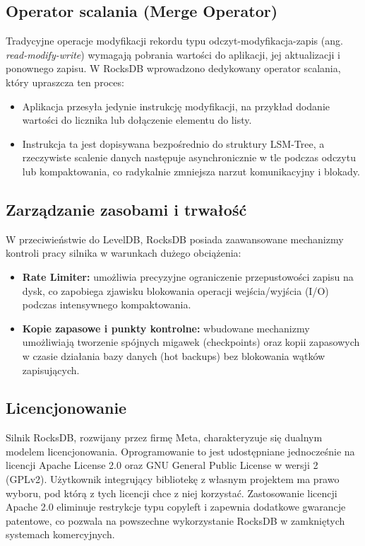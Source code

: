 \subsection{Operator scalania (Merge Operator)}
Tradycyjne operacje modyfikacji rekordu typu odczyt-modyfikacja-zapis (ang. \emph{read-modify-write}) wymagają pobrania wartości do aplikacji, jej aktualizacji i ponownego zapisu. W RocksDB wprowadzono dedykowany operator scalania, który upraszcza ten proces:
\begin{itemize}
    \item Aplikacja przesyła jedynie instrukcję modyfikacji, na przykład dodanie wartości do licznika lub dołączenie elementu do listy.
    \item Instrukcja ta jest dopisywana bezpośrednio do struktury LSM-Tree, a rzeczywiste scalenie danych następuje asynchronicznie w tle podczas odczytu lub kompaktowania, co radykalnie zmniejsza narzut komunikacyjny i blokady.
\end{itemize}

\subsection{Zarządzanie zasobami i trwałość}
W przeciwieństwie do LevelDB, RocksDB posiada zaawansowane mechanizmy kontroli pracy silnika w warunkach dużego obciążenia:
\begin{itemize}
    \item \textbf{Rate Limiter:} umożliwia precyzyjne ograniczenie przepustowości zapisu na dysk, co zapobiega zjawisku blokowania operacji wejścia/wyjścia (I/O) podczas intensywnego kompaktowania.
    \item \textbf{Kopie zapasowe i punkty kontrolne:} wbudowane mechanizmy umożliwiają tworzenie spójnych migawek (checkpoints) oraz kopii zapasowych w czasie działania bazy danych (hot backups) bez blokowania wątków zapisujących.
\end{itemize}

\subsection{Licencjonowanie}
Silnik RocksDB, rozwijany przez firmę Meta, charakteryzuje się dualnym modelem licencjonowania. Oprogramowanie to jest udostępniane jednocześnie na licencji Apache License 2.0 oraz GNU General Public License w wersji 2 (GPLv2). Użytkownik integrujący bibliotekę z własnym projektem ma prawo wyboru, pod którą z tych licencji chce z niej korzystać. Zastosowanie licencji Apache 2.0 eliminuje restrykcje typu copyleft i zapewnia dodatkowe gwarancje patentowe, co pozwala na powszechne wykorzystanie RocksDB w zamkniętych systemach komercyjnych.

